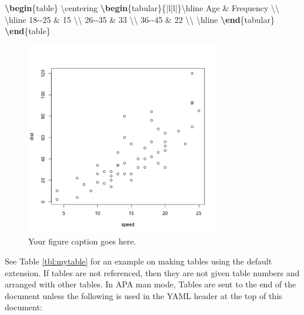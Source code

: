 \documentclass[\pandocDocMode,longtable,noextraspace,floatsintext]{apa6}
\newenvironment{Shaded}{}{}
\newcommand{\ExtensionTok}[1]{#1}
\newcommand{\FunctionTok}[1]{\textcolor[rgb]{0.02,0.16,0.49}{#1}}
\newcommand{\KeywordTok}[1]{\textcolor[rgb]{0.00,0.44,0.13}{\textbf{#1}}}
\newcommand{\NormalTok}[1]{#1}
\newcommand{\OperatorTok}[1]{\textcolor[rgb]{0.40,0.40,0.40}{#1}}
\begin{document}
\begin{Shaded}
\begin{Highlighting}[]
\KeywordTok{\textbackslash{}begin}\NormalTok{\{}\ExtensionTok{table}\NormalTok{\}}
\FunctionTok{\textbackslash{}centering}
\KeywordTok{\textbackslash{}begin}\NormalTok{\{}\ExtensionTok{tabular}\NormalTok{\}\{|l|l|\}}\FunctionTok{\textbackslash{}hline}
\NormalTok{Age }\OperatorTok{\&}\NormalTok{ Frequency }\FunctionTok{\textbackslash{}\textbackslash{}} \FunctionTok{\textbackslash{}hline}
\NormalTok{18{-}{-}25  }\OperatorTok{\&}\NormalTok{ 15 }\FunctionTok{\textbackslash{}\textbackslash{}}
\NormalTok{26{-}{-}35  }\OperatorTok{\&}\NormalTok{ 33 }\FunctionTok{\textbackslash{}\textbackslash{}}
\NormalTok{36{-}{-}45  }\OperatorTok{\&}\NormalTok{ 22 }\FunctionTok{\textbackslash{}\textbackslash{}} \FunctionTok{\textbackslash{}hline}
\KeywordTok{\textbackslash{}end}\NormalTok{\{}\ExtensionTok{tabular}\NormalTok{\}}
\KeywordTok{\textbackslash{}end}\NormalTok{\{}\ExtensionTok{table}\NormalTok{\}}
\end{Highlighting}
\end{Shaded}

\begin{figure}
\hypertarget{fig:myplot}{%
\centering
\includegraphics[width=3.333in,height=3.333in]{plot.png}
\caption{Your figure caption goes here.}\label{fig:myplot}
}
\end{figure}

See Table \ref{tbl:mytable} for an example on making tables using the
default extension. If tables are not referenced, then they are not given
table numbers and arranged with other tables. In APA man mode, Tables
are sent to the end of the document unless the following is used in the
YAML header at the top of this document:
\end{document}
